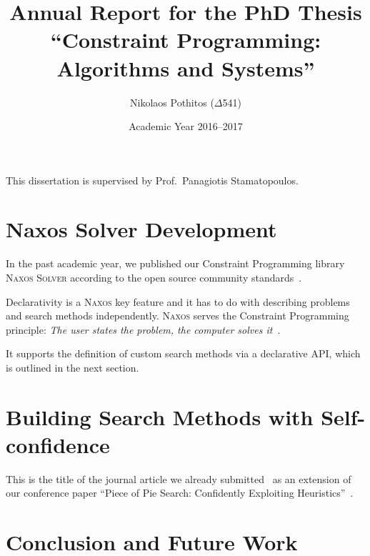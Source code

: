 \documentclass[a4paper]{article}
\begin{document}
\title{Annual Report for the PhD Thesis ``Constraint
       Programming: Algorithms and Systems''}

\author{Nikolaos Pothitos ($\Delta$541)}


\date{Academic Year 2016--2017}

\maketitle

This dissertation is supervised by Prof.~Panagiotis
Stamatopoulos.


\section{Naxos Solver Development}

In the past academic year, we published our Constraint
Programming library \textsc{Naxos Solver} according to the
open source community standards~\cite{Naxos}.

Declarativity is a \textsc{Naxos} key feature and it has to
do with describing problems and search methods
independently. \textsc{Naxos} serves the Constraint
Programming principle: \emph{The user states the problem,
the computer solves it}~\cite{Freuder2014}.

It supports the definition of custom search methods via a
declarative API, which is outlined in the next section.


\section{Building Search Methods with Self-confidence}

This is the title of the journal article we already
submitted~\cite{Pothitos2017} as an extension of our
conference paper ``Piece of Pie Search: Confidently
Exploiting Heuristics''~\cite{Pothitos2016-PoPS}.


\section{Conclusion and Future Work}



\end{document}
